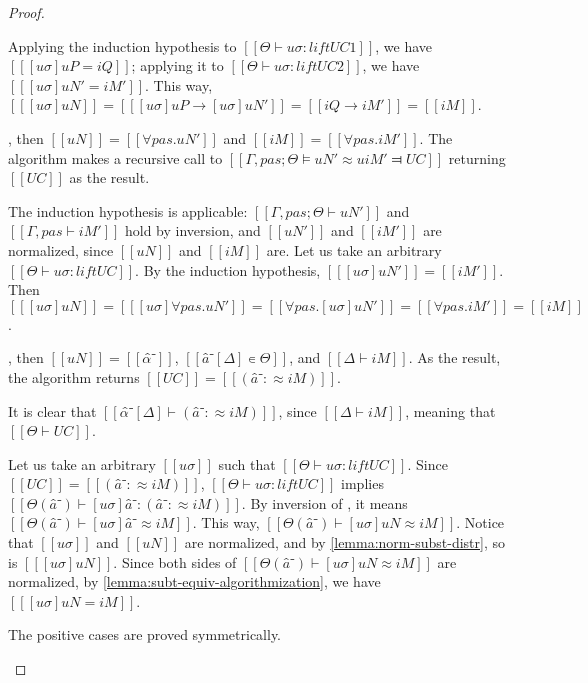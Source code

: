 \begin{proof}
\begin{caseof}
        Applying the induction hypothesis to $[[Θ ⊢ uσ : lift UC1]]$, we have
        $[[ [uσ]uP = iQ ]]$; applying it to $[[Θ ⊢ uσ : lift UC2]]$, we have
        $[[ [uσ]uN' = iM' ]]$.
        This way, $[[ [uσ]uN ]] = [[ [uσ]uP → [uσ]uN' ]] = [[ iQ → iM' ]] = [[ iM ]]$.

        \item {}, then $[[uN]] = [[∀pas.uN']]$ and $[[iM]] = [[∀pas.iM']]$.
        The algorithm makes a recursive call to $[[Γ,pas ; Θ ⊨ uN' ≈u iM' ⫤ UC]]$
        returning $[[UC]]$ as the result.

        The induction hypothesis is applicable: $[[Γ,pas ; Θ ⊢ uN']]$ and $[[Γ,pas ⊢ iM']]$ hold
        by inversion, and $[[uN']]$ and $[[iM']]$ are normalized, since $[[uN]]$ and $[[iM]]$ are.
        Let us take an arbitrary $[[Θ ⊢ uσ : lift UC]]$.
        By the induction hypothesis, $[[ [uσ]uN' ]] = [[ iM' ]]$. 
        Then $[[ [uσ]uN ]] = [[ [uσ]∀pas.uN' ]] = [[ ∀pas.[uσ]uN' ]] = [[ ∀pas.iM' ]] = [[ iM ]]$.

        \item {}, then $[[uN]] = [[α̂⁻]]$, $[[â⁻[Δ] ∊ Θ]]$, and $[[Δ ⊢ iM]]$.
        As the result, the algorithm returns $[[UC]] = [[ (â⁻ :≈ iM) ]]$.

        It is clear that $[[α̂⁻[Δ] ⊢ (â⁻ :≈ iM) ]]$, since $[[Δ ⊢ iM]]$, 
        meaning that $[[Θ ⊢ UC]]$.

        Let us take an arbitrary $[[uσ]]$ such that  $[[Θ ⊢ uσ : lift UC]]$.
        Since $[[UC]] = [[ (â⁻ :≈ iM) ]]$, $[[Θ ⊢ uσ : lift UC]]$ implies 
        $[[Θ(â⁻) ⊢ [uσ]â⁻ : (â⁻ :≈ iM) ]]$.
        By inversion of , it  means $[[Θ(â⁻) ⊢ [uσ]â⁻ ≈ iM]]$.
        This way, $[[Θ(â⁻) ⊢ [uσ]uN ≈ iM]]$. 
        Notice that $[[uσ]]$ and $[[uN]]$ are normalized, and by \cref{lemma:norm-subst-distr}, 
        so is $[[ [uσ]uN ]]$.
        Since both sides of $[[Θ(â⁻) ⊢ [uσ]uN ≈ iM]]$ are normalized,
        by \cref{lemma:subt-equiv-algorithmization}, we have $[[ [uσ]uN = iM ]]$.

        \item The positive cases are proved symmetrically.
    \end{caseof}
\end{proof}

